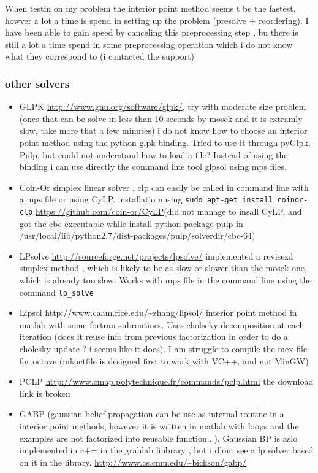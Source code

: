 \documentclass[11pt]{article}
\begin{document}
When testin on my problem the interior point method seems t be the fastest, howver a lot a time is spend in setting up the problem (presolve + reordering). I have been able to gain speed by canceling this preprocessing step , bu there is still a lot a time spend in some preprocessing operation which i do not know what they correspond to (i contacted the support)
\subsubsection{other solvers}
\begin{itemize}
\item GLPK
\url{http://www.gnu.org/software/glpk/}, try with moderate size problem (ones that can be solve in less than 10 seconds by mosek and it is extramly slow, take more that a few minutes) i do not know how to choose an interior point method using the python-glpk binding. 
Tried to use it through pyGlpk, Pulp, but could not understand how to load a file?
Instead of using the binding i can use directly the command line tool glpsol using mps files. 
\item Coin-Or simplex linear solver , clp can easily be called in command line with a mps file or using CyLP. installatio nusing \verb!sudo apt-get install coinor-clp!
\url{https://github.com/coin-or/CyLP}(did not manage to insall CyLP, and got the cbc executable while install python package pulp in /usr/local/lib/python2.7/dist-packages/pulp/solverdir/cbc-64)
\item LPsolve
\url{http://sourceforge.net/projects/lpsolve/}
implemented a revisezd simplex method , which is likely to be as slow or slower than the mosek one, which is already too slow. Works with mps file in the command line using the command \verb!lp_solve!
\item Lipsol \url{http://www.caam.rice.edu/~zhang/lipsol/}
interior point method in matlab with some fortran subroutines. Uses cholseky decomposition at each iteration (does it reuse info from previous factorization in order to do a cholesky update ? i seems like it does). I am struggle to compile the mex file for octave (mkoctfile
is designed first to work with VC++, and not MinGW)
\item 
PCLP \url{http://www.cmap.polytechnique.fr/commands/pclp.html} the download link is broken
\item GABP (gaussian belief propagation can be use as internal routine in a interior point methods, however it is written in matlab with loops and the examples are not factorized into reusable function...). Gaussian BP is aslo implemented in c+= in the grahlab linbrary , but i d'ont see a lp solver based on it in the library. \url{http://www.cs.cmu.edu/~bickson/gabp/}

\end{itemize}
\end{document}

